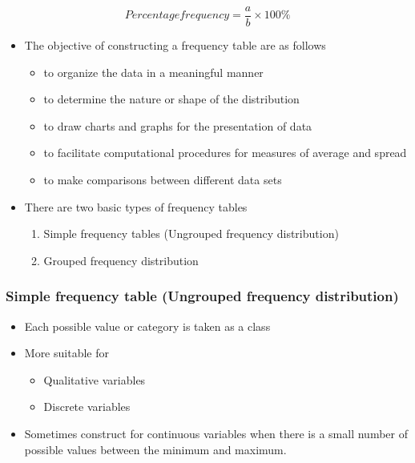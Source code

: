 \documentclass[]{book}
\providecommand{\tightlist}{%
  \setlength{\itemsep}{0pt}\setlength{\parskip}{0pt}}
\begin{document}
\[Percentage frequency = \frac{a}{b} \times100 \%\]

\begin{itemize}
\tightlist
\item
  The objective of constructing a frequency table are as follows

  \begin{itemize}
  \tightlist
  \item
    to organize the data in a meaningful manner
  \item
    to determine the nature or shape of the distribution
  \item
    to draw charts and graphs for the presentation of data
  \item
    to facilitate computational procedures for measures of average and spread
  \item
    to make comparisons between different data sets
  \end{itemize}
\item
  There are two basic types of frequency tables

  \begin{enumerate}
  \def\labelenumi{\arabic{enumi}.}
  \tightlist
  \item
    Simple frequency tables (Ungrouped frequency distribution)
  \item
    Grouped frequency distribution
  \end{enumerate}
\end{itemize}

\hypertarget{simple-frequency-table-ungrouped-frequency-distribution}{%
\subsubsection{Simple frequency table (Ungrouped frequency distribution)}\label{simple-frequency-table-ungrouped-frequency-distribution}}

\begin{itemize}
\tightlist
\item
  Each possible value or category is taken as a class
\item
  More suitable for

  \begin{itemize}
  \tightlist
  \item
    Qualitative variables
  \item
    Discrete variables
  \end{itemize}
\item
  Sometimes construct for continuous variables when there is a small number of possible values between the minimum and maximum.
\end{itemize}
\end{document}
